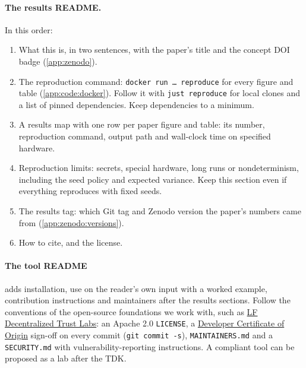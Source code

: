 \paragraph{The results README.} In this order:
\begin{enumerate}[noitemsep]
  \item What this is, in two sentences, with the paper's title and the concept DOI badge (\cref{app:zenodo}).
  \item The reproduction command: \texttt{docker run \dots{} reproduce} for every figure and table (\cref{app:code:docker}). Follow it with \texttt{just reproduce} for local clones and a list of pinned dependencies. Keep dependencies to a minimum.
  \item A results map with one row per paper figure and table: its number, reproduction command, output path and wall-clock time on specified hardware.
  \item Reproduction limits: secrets, special hardware, long runs or nondeterminism, including the seed policy and expected variance. Keep this section even if everything reproduces with fixed seeds.
  \item The results tag: which Git tag and Zenodo version the paper's numbers came from (\cref{app:zenodo:versions}).
  \item How to cite, and the license.
\end{enumerate}

\paragraph{The tool README} adds installation, use on the reader's own input with a worked example, contribution instructions and maintainers after the results sections. Follow the conventions of the open-source foundations we work with, such as \href{https://github.com/LF-Decentralized-Trust/lab-proposals/blob/main/README.md}{LF Decentralized Trust Labs}: an Apache 2.0 \texttt{LICENSE}, a \href{https://developercertificate.org/}{Developer Certificate of Origin} sign-off on every commit (\texttt{git commit -s}), \texttt{MAINTAINERS.md} and a \texttt{SECURITY.md} with vulnerability-reporting instructions. A compliant tool can be proposed as a lab after the TDK.

